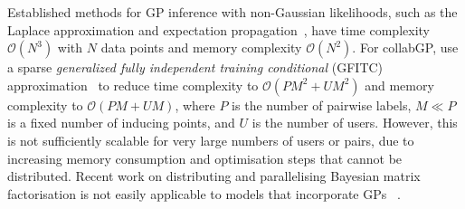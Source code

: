 Established methods for GP inference with non-Gaussian likelihoods,
such as the Laplace approximation 
and expectation propagation~\citep{rasmussen_gaussian_2006}, have
time complexity $\mathcal{O}(N^3)$ with $N$ data points
 and memory complexity $\mathcal{O}(N^2)$. 
For collabGP, \citet{houlsby2012collaborative}
use a sparse \emph{generalized fully independent training conditional} (GFITC) 
approximation~\citep{snelson2006sparse} to reduce time complexity to $\mathcal{O}(PM^2 + UM^2)$ and 
memory complexity to $\mathcal{O}(PM + UM)$,
where $P$ is the number of pairwise labels, 
$M \ll P$ is a fixed number of inducing points, 
and $U$ is the number of users.
However, this is not sufficiently scalable
for very large numbers of users or pairs, 
due to increasing memory consumption 
and optimisation steps that cannot be distributed. %
Recent work on distributing and parallelising Bayesian matrix factorisation 
is not easily applicable to models that incorporate GPs
 ~\citep{ahn2015large,saha2015scalable,vander2017distributed,chen2018large}. 
 

